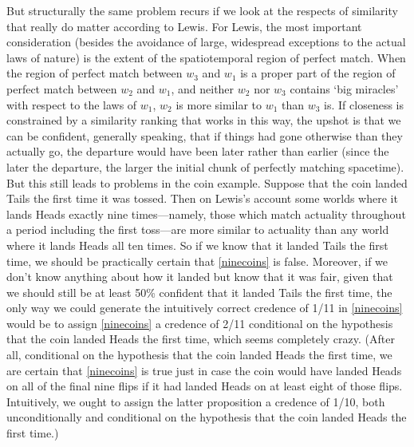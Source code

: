 \documentclass[leqno, 11pt, a5paper, openany]{article}
\begin{document}
But structurally the same problem recurs if we look at the respects of similarity that really do matter according to Lewis. For Lewis, the most important consideration (besides the avoidance of large, widespread exceptions to the actual laws of nature) is the extent of the spatiotemporal region of perfect match. When the region of perfect match between $w_3$ and $w_1$ is a proper part of the region of perfect match between $w_2$ and $w_1$, and neither $w_2$ nor $w_3$ contains ‘big miracles’ with respect to the laws of $w_1$, $w_2$ is more similar to $w_1$ than $w_3$ is. If closeness is constrained by a similarity ranking that works in this way, the upshot is that we can be confident, generally speaking, that if things had gone otherwise than they actually go, the departure would have been later rather than earlier (since the later the departure, the larger the initial chunk of perfectly matching spacetime). But this still leads to problems in the coin example. Suppose that the coin landed Tails the first time it was tossed. Then on Lewis's account some worlds where it lands Heads exactly nine times---namely, those which match actuality throughout a period including the first toss---are more similar to actuality than any world where it lands Heads all ten times. So if we know that it landed Tails the first time, we should be practically certain that \ref{ninecoins} is false. Moreover, if we don't know anything about how it landed but know that it was fair, given that we should still be at least 50\% confident that it landed Tails the first time, the only way we could generate the intuitively correct credence of 1/11 in \ref{ninecoins} would be to assign \ref{ninecoins} a credence of 2/11 conditional on the hypothesis that the coin landed Heads the first time, which seems completely crazy. (After all, conditional on the hypothesis that the coin landed Heads the first time, we are certain that \ref{ninecoins} is true just in case the coin would have landed Heads on all of the final nine flips if it had landed Heads on at least eight of those flips. Intuitively, we ought to assign the latter proposition a credence of 1/10, both unconditionally and conditional on the hypothesis that the coin landed Heads the first time.)
\end{document}
